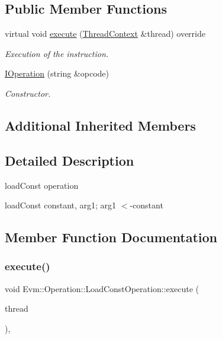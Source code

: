 \subsection*{Public Member Functions}
\begin{DoxyCompactItemize}
\item 
virtual void \mbox{\hyperlink{struct_evm_1_1_operation_1_1_load_const_operation_a434d2748c59ccf0e3d1977e87c110e15}{execute}} (\mbox{\hyperlink{struct_evm_1_1_thread_context}{Thread\+Context}} \&thread) override
\begin{DoxyCompactList}\small\item\em Execution of the instruction. \end{DoxyCompactList}\item 
\mbox{\hyperlink{struct_evm_1_1_operation_1_1_load_const_operation_a65e98ee1b1679e12c1d1dd000ebfe937}{I\+Operation}} (string \&opcode)
\begin{DoxyCompactList}\small\item\em Constructor. \end{DoxyCompactList}\end{DoxyCompactItemize}
\subsection*{Additional Inherited Members}


\subsection{Detailed Description}
load\+Const operation 

load\+Const constant, arg1; arg1 $<$-\/constant 

\subsection{Member Function Documentation}
\mbox{\label{struct_evm_1_1_operation_1_1_load_const_operation_a434d2748c59ccf0e3d1977e87c110e15}} 
\subsubsection{\texorpdfstring{execute()}{execute()}}
{\footnotesize\ttfamily void Evm\+::\+Operation\+::\+Load\+Const\+Operation\+::execute (\begin{DoxyParamCaption}\item[{\mbox{\hyperlink{struct_evm_1_1_thread_context}{Thread\+Context}} \&}]{thread }\end{DoxyParamCaption})\hspace{0.3cm}{\ttfamily [override]}, {\ttfamily [virtual]}}



